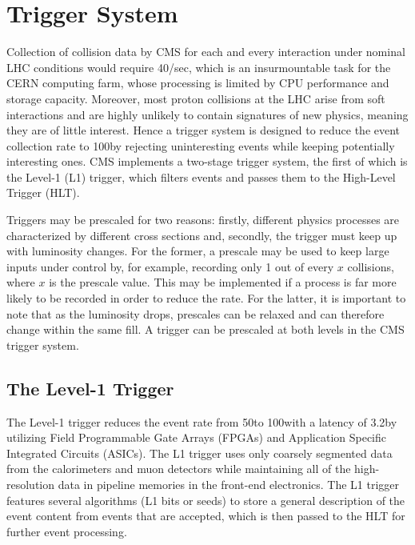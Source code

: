 \section{Trigger System}
\label{sec:trigger}
Collection of collision data by CMS for each and every interaction under nominal LHC conditions would require 40\TB/sec, which is an insurmountable task for the CERN computing farm, whose processing is limited by CPU performance and storage capacity.
Moreover, most proton collisions at the LHC arise from soft interactions and are highly unlikely to contain signatures of new physics, meaning they are of little interest.
Hence a trigger system is designed to reduce the event collection rate to 100\KHz by rejecting uninteresting events while keeping potentially interesting ones.
CMS implements a two-stage trigger system, the first of which is the Level-1 (L1) trigger, which filters events and passes them to the High-Level Trigger (HLT).

Triggers may be prescaled for two reasons:
firstly, different physics processes are characterized by different cross sections and,
secondly, the trigger must keep up with luminosity changes.
For the former, a prescale may be used to keep large inputs under control by, for example, recording only 1 out of every $x$ collisions, where $x$ is the prescale value.
This may be implemented if a process is far more likely to be recorded in order to reduce the rate.
For the latter, it is important to note that as the luminosity drops, prescales can be relaxed and can therefore change within the same fill.
A trigger can be prescaled at both levels in the CMS trigger system.

\subsection{The Level-1 Trigger}
\label{sec:L1_trig}
The Level-1 trigger reduces the event rate from 50\MHz to 100\KHz with a latency of 3.2\mus by utilizing Field Programmable Gate Arrays (FPGAs) and Application Specific Integrated Circuits (ASICs).
The L1 trigger uses only coarsely segmented data from the calorimeters and muon detectors while maintaining all of the high-resolution data in pipeline memories in the front-end electronics.
The L1 trigger features several algorithms (L1 bits or seeds) to store a general description of the event content from events that are accepted, which is then passed to the HLT for further event processing.

